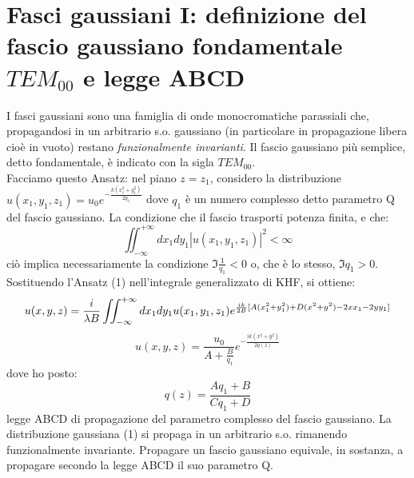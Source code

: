 \section{Fasci gaussiani I: definizione del fascio gaussiano fondamentale $TEM_{00}$ e legge ABCD}
I fasci gaussiani sono una famiglia di onde monocromatiche parassiali che, propagandosi in un arbitrario s.o. gaussiano (in particolare in propagazione libera cioè in vuoto) restano \textit{funzionalmente invarianti}. Il fascio gaussiano più semplice, detto fondamentale, è indicato con la sigla $TEM_{00}$.\\
Facciamo questo Ansatz:
nel piano $z = z_1$, considero la distribuzione $u(x_1,y_1,z_1) = u_0 e^{-\frac{k(x_1^2 + y_1^2)}{2 q_1}}$ dove $q_1$ è un numero complesso detto parametro Q del fascio gaussiano. La condizione che il fascio trasporti potenza finita, e che:
\begin{equation*}
\iint_{-\infty}^{+\infty} dx_1 dy_1 |u(x_1,y_1,z_1)|^2 < \infty
\end{equation*}
ciò implica necessariamente la condizione $\Im{\frac{1}{q_1}} < 0$ o, che è lo stesso, $\Im{q_1} > 0$. Sostituendo l'Ansatz (1) nell'integrale generalizzato di KHF, si ottiene:
\begin{equation*}
u(x,y,z) = \frac{i}{\lambda B} \iint_{-\infty}^{+\infty} dx_1 dy_1 u(x_1,y_1,z_1) e^{\frac{ik}{2B} [A (x_1^2 + y_1^2) + D(x^2 + y^2) -2xx_1 - 2yy_1]}
\end{equation*}
\begin{equation*}
u(x,y,z) = \frac{u_0}{A + \frac{B}{q_1}} e^{-\frac{ik(x^2 + y^2)}{2q(z)}}
\end{equation*}
dove ho posto:
\begin{equation*}
q(z) = \frac{Aq_1 + B}{Cq_1 + D}
\end{equation*}
legge ABCD di propagazione del parametro complesso del fascio gaussiano.
La distribuzione gaussiana (1) si propaga in un arbitrario s.o. rimanendo funzionalmente invariante. Propagare un fascio gaussiano equivale, in sostanza, a propagare secondo la legge ABCD il suo parametro Q.\\
